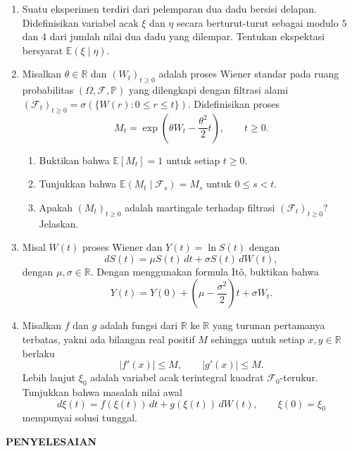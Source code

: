 \documentclass[11pt,a4paper]{article}
\newcommand{\E}{\mathbb{E}}
\newcommand{\PP}{\mathbb{P}}
\newcommand{\R}{\mathbb{R}}
\newcommand{\F}{\mathcal{F}}
\begin{document}
\begin{enumerate}[leftmargin=*, itemsep=0.5cm]
  \item Suatu eksperimen terdiri dari pelemparan dua dadu bersisi delapan. Didefinisikan
        variabel acak $\xi$ dan $\eta$ secara berturut-turut sebagai modulo $5$ dan $4$
        dari jumlah nilai dua dadu yang dilempar. Tentukan ekspektasi bersyarat
        $\E(\xi\mid\eta)$.

  \item Misalkan $\theta\in\R$ dan $(W_t)_{t\ge 0}$ adalah proses Wiener standar pada
        ruang probabilitas $(\Omega,\F,\PP)$ yang dilengkapi dengan filtrasi alami
        $(\F_t)_{t\ge 0}=\sigma(\{W(r):0\le r\le t\})$. Didefinisikan proses
        \[
          M_t=\exp\left(\theta W_t-\frac{\theta^2}{2}t\right),\qquad t\ge 0.
        \]
        \begin{enumerate}[label=\alph*)]
          \item Buktikan bahwa $\E[M_t]=1$ untuk setiap $t\ge 0$.
          \item Tunjukkan bahwa $\E(M_t\mid\F_s)=M_s$ untuk $0\le s<t$.
          \item Apakah $(M_t)_{t\ge 0}$ adalah martingale terhadap filtrasi $(\F_t)_{t\ge 0}$?
                Jelaskan.
        \end{enumerate}

  \item Misal $W(t)$ proses Wiener dan $Y(t)=\ln S(t)$ dengan
        \[
          dS(t)=\mu S(t)\,dt+\sigma S(t)\,dW(t),
        \]
        dengan $\mu,\sigma\in\R$. Dengan menggunakan formula It\^o, buktikan bahwa
        \[
          Y(t)=Y(0)+\left(\mu-\frac{\sigma^2}{2}\right)t+\sigma W_t.
        \]

  \item Misalkan $f$ dan $g$ adalah fungsi dari $\R$ ke $\R$ yang turunan pertamanya
        terbatas, yakni ada bilangan real positif $M$ sehingga untuk setiap $x,y\in\R$
        berlaku
        \[
          |f'(x)|\le M,\qquad |g'(x)|\le M.
        \]
        Lebih lanjut $\xi_0$ adalah variabel acak terintegral kuadrat $\F_0$-terukur.
        Tunjukkan bahwa masalah nilai awal
        \[
          d\xi(t)=f(\xi(t))\,dt+g(\xi(t))\,dW(t),\qquad \xi(0)=\xi_0
        \]
        mempunyai solusi tunggal.
\end{enumerate}

\newpage

\begin{center}
  \textbf{PENYELESAIAN}
\end{center}
\end{document}
